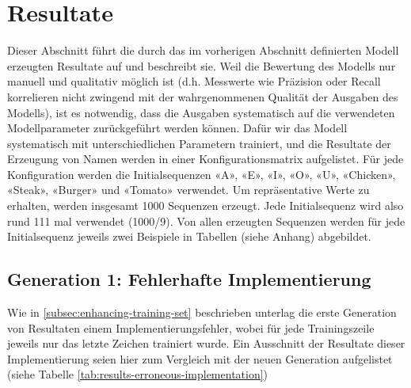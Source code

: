 \chapter{Resultate}
\label{ch:results}

\newcommand{\sn} {\vspace{1.2mm}\newline}

Dieser Abschnitt führt die durch das im vorherigen Abschnitt definierten Modell erzeugten Resultate auf und beschreibt sie.
Weil die Bewertung des Modells nur manuell und qualitativ möglich ist (d.h. Messwerte wie Präzision oder Recall korrelieren nicht zwingend
mit der wahrgenommenen Qualität der Ausgaben des Modells), ist es notwendig, dass die Ausgaben systematisch auf die verwendeten
Modellparameter zurückgeführt werden können.
Dafür wir das Modell systematisch mit unterschiedlichen Parametern trainiert, und die Resultate der Erzeugung von Namen
werden in einer Konfigurationsmatrix aufgelistet.
Für jede Konfiguration werden die Initialsequenzen «A», «E», «I», «O», «U», «Chicken», «Steak», «Burger» und «Tomato» verwendet.
Um repräsentative Werte zu erhalten, werden insgesamt 1000 Sequenzen erzeugt.
Jede Initialsequenz wird also rund 111 mal verwendet (1000/9).
Von allen erzeugten Sequenzen werden für jede Initialsequenz jeweils zwei Beispiele in Tabellen (siehe Anhang) abgebildet.

\section{Generation 1: Fehlerhafte Implementierung}
\label{sec:erroneous-model}

Wie in \ref{subsec:enhancing-training-set} beschrieben unterlag die erste Generation von Resultaten einem Implementierungsfehler,
wobei für jede Trainingszeile jeweils nur das letzte Zeichen trainiert wurde.
Ein Ausschnitt der Resultate dieser Implementierung seien hier zum Vergleich mit der neuen Generation aufgelistet (siehe Tabelle \ref{tab:results-erroneous-implementation})

